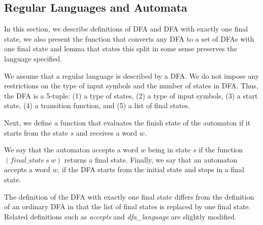 \subsection{Regular Languages and Automata}

In this section, we describe definitions of DFA and DFA with exactly one final state, we also present the function that converts any DFA to a set of DFAs with one final state and lemma that states this split in some sense preserves the language specified.

We assume that a regular language is described by a DFA. We do not impose any restrictions on the type of input symbols and the number of states in DFA. Thus, the DFA is a 5-tuple: (1) a type of states, (2) a type of input symbols, (3) a start state, (4) a transition function, and (5) a list of final states.


Next, we define a function that evaluates the finish state of the automaton if it starts from the state $s$ and receives a word $w$.


We say that the automaton accepts a word $w$ being in state $s$ if the function $(\textit{final\_state} \ s \ w)$ returns a final state.
Finally, we say that an automaton accepts a word $w$, if the DFA starts from the initial state and stops in a final state.


The definition of the  DFA with exactly one final state differs from the definition of an ordinary DFA in that the list of final states is replaced by one final state.
Related definitions such as \textit{accepts} and \textit{dfa\_language} are slightly modified.


